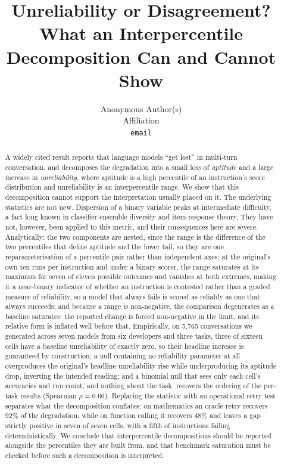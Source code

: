 \documentclass{article}
\title{Unreliability or Disagreement?\\
What an Interpercentile Decomposition Can and Cannot Show}
\author{Anonymous Author(s)\\Affiliation\\\texttt{email}}
\begin{document}
\maketitle

\begin{abstract}
A widely cited result reports that language models ``get lost'' in multi-turn conversation, and
decomposes the degradation into a small loss of \emph{aptitude} and a large increase in
\emph{unreliability}, where aptitude is a high percentile of an instruction's score distribution
and unreliability is an interpercentile range. We show that this decomposition cannot support the interpretation usually placed on it. The underlying statistics are not new. Dispersion of a binary variable peaks at intermediate difficulty, a fact long known in classifier-ensemble diversity and item-response theory. They have not, however, been applied to this metric, and their consequences here are severe. Analytically: the two components are nested, since the range
is the difference of the two percentiles that define aptitude and the lower tail, so they are one
reparameterisation of a percentile pair rather than independent axes; at the original's own ten runs per instruction and under a binary scorer, the
range saturates at its maximum for seven of eleven possible outcomes and vanishes at both extremes, making it a near-binary indicator of whether an instruction is contested rather than a graded measure of reliability, so a
model that always fails is scored as reliably as one that always succeeds; and because a range is
non-negative, the comparison degenerates as a baseline saturates: the reported change is forced
non-negative in the limit, and its relative form is inflated well before that. Empirically, on 5{,}765 conversations we generated across seven models from six developers and three tasks, three of sixteen cells have a baseline unreliability of exactly zero, so
their headline increase is guaranteed by construction; a null containing no reliability parameter at all overproduces the original's headline unreliability rise while underproducing its aptitude drop, inverting the intended reading; and a binomial null that sees only
each cell's accuracies and run count, and nothing about the task, recovers the ordering of the
per-task results (Spearman $\rho = 0.66$). Replacing the statistic with an operational retry test separates what the decomposition conflates: on mathematics an oracle retry recovers $92\%$ of the degradation, while on function calling it recovers $48\%$ and leaves a gap strictly positive in seven of seven cells, with a fifth of instructions failing deterministically. We conclude that interpercentile decompositions should
be reported alongside the percentiles they are built from, and that benchmark saturation must be
checked before such a decomposition is interpreted.
\end{abstract}
\end{document}
